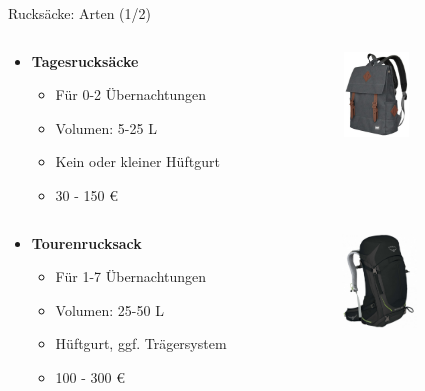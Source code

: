 \documentclass[aspectratio=169]{beamer}
\begin{document}
			\begin{frame}{Rucksäcke: Arten (1/2)}
				\begin{columns}[c]
					\begin{column}{0.64\textwidth}
						\begin{itemize}
							\item \textbf{Tagesrucksäcke}
							\begin{itemize}
								\item Für 0-2 Übernachtungen
								\item Volumen: 5-25 L
								\item Kein oder kleiner Hüftgurt
								\item 30 - 150 €
							\end{itemize}
						\end{itemize}
					\end{column}
					\begin{column}{0.34\textwidth}
						\includegraphics[height=2.25cm]{images/backpack-small.png}
					\end{column}
				\end{columns}
				\vspace{0.4cm}
				\pause
				\begin{columns}[c]
					\begin{column}{0.64\textwidth}
						\begin{itemize}
							\item \textbf{Tourenrucksack}
							\begin{itemize}
								\item Für 1-7 Übernachtungen
								\item Volumen: 25-50 L
								\item Hüftgurt, ggf. Trägersystem
								\item 100 - 300 €
							\end{itemize}
						\end{itemize}
					\end{column}
					\begin{column}{0.34\textwidth}
						\includegraphics[height=2.5cm]{images/backpack-medium.png}
					\end{column}
				\end{columns}
			\end{frame}
				
\end{document}
